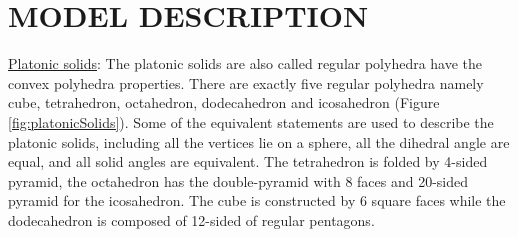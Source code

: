 \section{MODEL DESCRIPTION}
\label{sec:problemFormulation}
\noindent\uline{Platonic solids}:
The platonic solids are also called regular polyhedra have the convex polyhedra properties. 
There are exactly five regular polyhedra namely cube, tetrahedron, octahedron, dodecahedron and icosahedron (Figure \ref{fig:platonicSolids}). 
Some of the equivalent statements are used to describe the platonic solids, including all the vertices lie on a sphere, all the dihedral angle are equal, and all solid angles are equivalent. 
The tetrahedron is folded by 4-sided pyramid, the octahedron has the double-pyramid with $8$ faces and 20-sided pyramid for the icosahedron. The cube is constructed by $6$ square faces while the dodecahedron is composed of 12-sided of regular pentagons.\\

